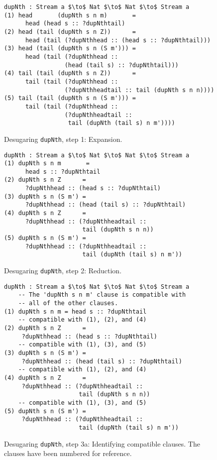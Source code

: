 \begin{figure}[h]
\begin{lstlisting}[mathescape]
    dupNth : Stream a $\to$ Nat $\to$ Nat $\to$ Stream a
(1) head       (dupNth s n m)       =
      head (head s :: ?dupNthtail)
(2) head (tail (dupNth s n Z))      = 
      head (tail (?dupNthhead :: (head s :: ?dupNthtail)))
(3) head (tail (dupNth s n (S m'))) =
      head (tail (?dupNthhead :: 
                 (head (tail s) :: ?dupNthtail)))
(4) tail (tail (dupNth s n Z))      =
      tail (tail (?dupNthhead :: 
                 (?dupNthheadtail :: tail (dupNth s n n))))
(5) tail (tail (dupNth s n (S m'))) =
      tail (tail (?dupNthhead :: 
                 (?dupNthheadtail :: 
                  tail (dupNth (tail s) n m'))))
\end{lstlisting}
  \caption{Desugaring \texttt{dupNth}, step 1: Expansion.}
  \label{fig:desugared_dupNth_step1}
\end{figure}

\begin{figure}[H]
\begin{lstlisting}[mathescape]
    dupNth : Stream a $\to$ Nat $\to$ Nat $\to$ Stream a
(1) dupNth s n m       =
      head s :: ?dupNthtail
(2) dupNth s n Z      = 
      ?dupNthhead :: (head s :: ?dupNthtail)
(3) dupNth s n (S m') =
      ?dupNthhead :: (head (tail s) :: ?dupNthtail)
(4) dupNth s n Z      =
      ?dupNthhead :: (?dupNthheadtail :: 
                      tail (dupNth s n n))
(5) dupNth s n (S m') =
      ?dupNthhead :: (?dupNthheadtail :: 
                      tail (dupNth (tail s) n m'))
\end{lstlisting}
  \caption{Desugaring \texttt{dupNth}, step 2: Reduction.}
  \label{fig:desugared_dupNth_step2}
\end{figure}

\begin{figure}[h]
\begin{lstlisting}[mathescape]
    dupNth : Stream a $\to$ Nat $\to$ Nat $\to$ Stream a
    -- The 'dupNth s n m' clause is compatible with 
    -- all of the other clauses.
(1) dupNth s n m = head s :: ?dupNthtail
    -- compatible with (1), (2), and (4)
(2) dupNth s n Z      = 
     ?dupNthhead :: (head s :: ?dupNthtail) 
    -- compatible with (1), (3), and (5)
(3) dupNth s n (S m') =
     ?dupNthhead :: (head (tail s) :: ?dupNthtail)
    -- compatible with (1), (2), and (4)
(4) dupNth s n Z      =
     ?dupNthhead :: (?dupNthheadtail :: 
                     tail (dupNth s n n))
    -- compatible with (1), (3), and (5)
(5) dupNth s n (S m') =
     ?dupNthhead :: (?dupNthheadtail :: 
                     tail (dupNth (tail s) n m'))
\end{lstlisting}
  \caption{Desugaring \texttt{dupNth}, step 3a: Identifying compatible
    clauses. The clauses have been numbered for reference.}
  \label{fig:desugared_dupNth_step3a}
\end{figure}

